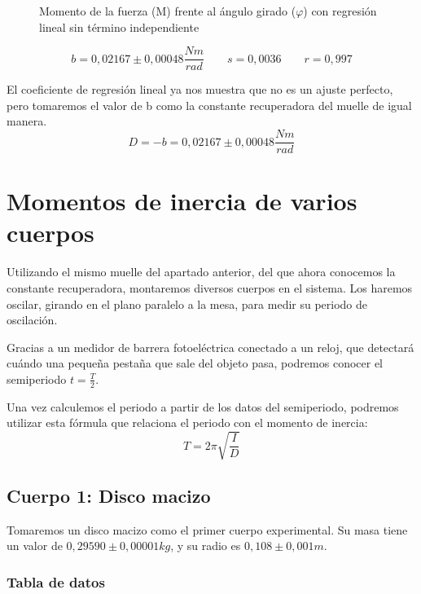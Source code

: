 \documentclass[12pt, a4paper, titlepage]{article}
\begin{document}
  \begin{figure}[H]
    \hspace{3.2em} 
    \caption{Momento de la fuerza (M) frente al ángulo girado ($\varphi$) con regresión lineal sin término independiente}
  \end{figure}
  \begin{equation*}
    b = 0,02167 \pm 0,00048 \frac{Nm}{rad} \qquad s = 0,0036 \qquad r= 0,997
  \end{equation*}

  El coeficiente de regresión lineal ya nos muestra que no es un ajuste perfecto, pero tomaremos el valor de b como la constante recuperadora del muelle de igual manera.
  \begin{equation*}
    D = -b = 0,02167 \pm 0,00048 \frac{Nm}{rad}
  \end{equation*}


  \newpage
  \section{Momentos de inercia de varios cuerpos}

  Utilizando el mismo muelle del apartado anterior, del que ahora conocemos la constante recuperadora, montaremos diversos cuerpos en el sistema. Los haremos oscilar, girando en el plano paralelo a la mesa, para medir su periodo de oscilación.

  Gracias a un medidor de barrera fotoeléctrica conectado a un reloj, que detectará cuándo una pequeña pestaña que sale del objeto pasa, podremos conocer el semiperiodo $t = \frac{T}{2}$.

  Una vez calculemos el periodo a partir de los datos del semiperiodo, podremos utilizar esta fórmula que relaciona el periodo con el momento de inercia:
  \begin{equation}
    T = 2 \pi \sqrt{\frac{I}{D}} \label{ec:periodoinercia}
  \end{equation}

  \subsection{Cuerpo 1: Disco macizo}

  Tomaremos un disco macizo como el primer cuerpo experimental. Su masa tiene un valor de $0,29590 \pm 0,00001 kg$, y su radio es $0,108 \pm 0,001 m$.

  \subsubsection{Tabla de datos}
\end{document}
